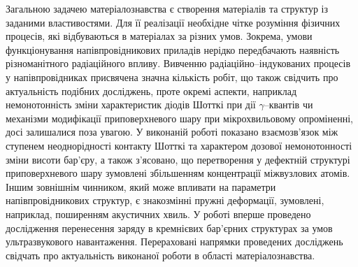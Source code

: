 Загальною задачею матеріалознавства є створення матеріалів та структур із заданими властивостями.
Для її реалізації необхідне чітке розуміння фізичних процесів, які відбуваються в матеріалах за різних умов.
Зокрема, умови функціонування напівпровідникових приладів нерідко передбачають наявність різноманітного радіаційного впливу.
Вивченню радіаційно--індукованих процесів у напівпровідниках присвячена значна кількість робіт, що також свідчить про актуальність подібних досліджень,
проте окремі аспекти, наприклад немонотонність зміни характеристик діодів Шотткі при дії $\gamma$--квантів чи механізми модифікації приповерхневого шару при мікрохвильовому опроміненні, досі залишалися поза увагою.
У виконаній роботі показано взаємозв'язок між ступенем неоднорідності контакту Шотткі та характером дозової немонотонності зміни висоти бар'єру, а також з'ясовано, що перетворення у дефектній структурі приповерхневого шару зумовлені збільшенням концентрації міжвузлових атомів.
Іншим зовнішнім чинником, який може впливати на параметри напівпровідникових структур, є знакозмінні пружні деформації, зумовлені, наприклад, поширенням акустичних хвиль.
У роботі вперше проведено дослідження перенесення заряду в кремнієвих бар'єрних структурах за умов ультразвукового навантаження.
Перераховані напрямки проведених досліджень свідчать про актуальність виконаної роботи в області матеріалознавства.



